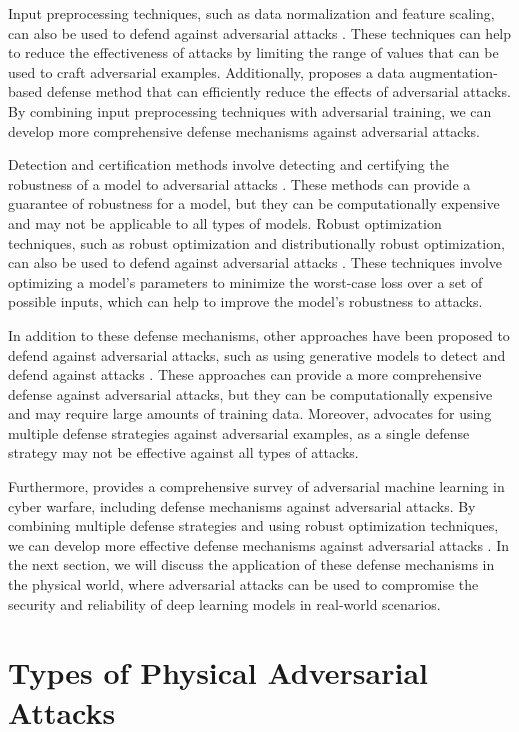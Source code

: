 \documentclass[11pt]{article}
\begin{document}
Input preprocessing techniques, such as data normalization and feature scaling, can also be used to defend against adversarial attacks \cite{ref44}. These techniques can help to reduce the effectiveness of attacks by limiting the range of values that can be used to craft adversarial examples. Additionally, \cite{ref45} proposes a data augmentation-based defense method that can efficiently reduce the effects of adversarial attacks. By combining input preprocessing techniques with adversarial training, we can develop more comprehensive defense mechanisms against adversarial attacks.

Detection and certification methods involve detecting and certifying the robustness of a model to adversarial attacks \cite{ref46}. These methods can provide a guarantee of robustness for a model, but they can be computationally expensive and may not be applicable to all types of models. Robust optimization techniques, such as robust optimization and distributionally robust optimization, can also be used to defend against adversarial attacks \cite{ref47}. These techniques involve optimizing a model's parameters to minimize the worst-case loss over a set of possible inputs, which can help to improve the model's robustness to attacks.

In addition to these defense mechanisms, other approaches have been proposed to defend against adversarial attacks, such as using generative models to detect and defend against attacks \cite{ref48}. These approaches can provide a more comprehensive defense against adversarial attacks, but they can be computationally expensive and may require large amounts of training data. Moreover, \cite{ref49} advocates for using multiple defense strategies against adversarial examples, as a single defense strategy may not be effective against all types of attacks.

Furthermore, \cite{ref50} provides a comprehensive survey of adversarial machine learning in cyber warfare, including defense mechanisms against adversarial attacks. By combining multiple defense strategies and using robust optimization techniques, we can develop more effective defense mechanisms against adversarial attacks \cite{ref51}. In the next section, we will discuss the application of these defense mechanisms in the physical world, where adversarial attacks can be used to compromise the security and reliability of deep learning models in real-world scenarios.

\section{Types of Physical Adversarial Attacks}
\end{document}
